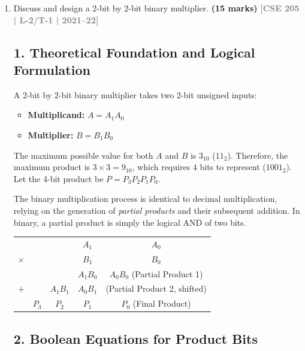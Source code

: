 \documentclass[12pt,a3paper]{article}
\newcommand{\yr}[1]{\hfill\textcolor{gray}{\small\textbf{[#1]}}}
\newcommand{\mk}[1]{\textcolor{orange!70!black}{\small\textbf{(#1 marks)}}}
\begin{document}
\begin{enumerate}

\item Discuss and design a 2-bit by 2-bit binary multiplier.
\mk{15} \yr{CSE 205 | L-2/T-1 | 2021--22}

\begin{tcolorbox}[enhanced,breakable,ansbox,colback=cD!4,colframe=cD,boxrule=0.8pt,arc=5pt,title={\textbf{Answer}},fonttitle=\bfseries\color{white},colbacktitle=cD]

\subsection*{1. Theoretical Foundation and Logical Formulation}

A 2-bit by 2-bit binary multiplier takes two 2-bit unsigned inputs:
\begin{itemize}
    \item \textbf{Multiplicand:} $A = A_1 A_0$
    \item \textbf{Multiplier:} $B = B_1 B_0$
\end{itemize}
The maximum possible value for both $A$ and $B$ is $3_{10}$ ($11_2$). Therefore, the maximum product is $3 \times 3 = 9_{10}$, which requires $4$ bits to represent ($1001_2$). Let the 4-bit product be $P = P_3 P_2 P_1 P_0$.

The binary multiplication process is identical to decimal multiplication, relying on the generation of \textit{partial products} and their subsequent addition. In binary, a partial product is simply the logical AND of two bits.

\vspace{0.2cm}
\begin{center}
\renewcommand{\arraystretch}{1.2}
\begin{tabular}{ccccc}
  &   &   & $A_1$ & $A_0$ \\
$\times$ &   &   & $B_1$ & $B_0$ \\
\toprule
  &   &   & $A_1 B_0$ & $A_0 B_0$ \quad \textcolor{cD}{(Partial Product 1)} \\
+ &   & $A_1 B_1$ & $A_0 B_1$ & \quad \quad \quad \textcolor{cD}{(Partial Product 2, shifted)} \\
\midrule
  & $P_3$ & $P_2$ & $P_1$ & $P_0$ \quad \textcolor{cD}{(Final Product)} \\
\bottomrule
\end{tabular}
\end{center}

\subsection*{2. Boolean Equations for Product Bits}


\end{tcolorbox}
\end{enumerate}
\end{document}
